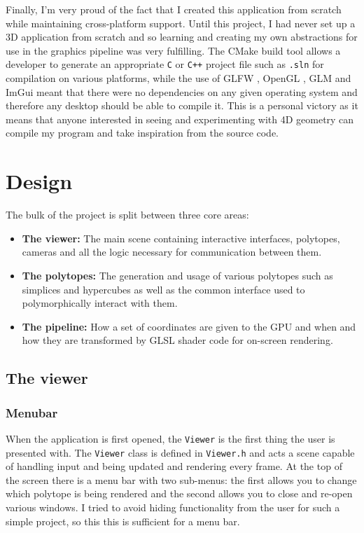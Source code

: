 \documentclass[11pt, a4paper]{article}
\begin{document}
Finally, I'm very proud of the fact that I created this application from scratch while maintaining cross-platform support. Until this project, I had never set up a 3D application from scratch and so learning and creating my own abstractions for use in the graphics pipeline was very fulfilling. The CMake build tool \parencite{cmake} allows a developer to generate an appropriate \texttt{C} or \texttt{C++} project file such as \texttt{.sln} for compilation on various platforms, while the use of GLFW \parencite{glfw}, OpenGL \parencite{opengl}, GLM \parencite{glm} and ImGui \parencite{imgui} meant that there were no dependencies on any given operating system and therefore any desktop should be able to compile it. This is a personal victory as it means that anyone interested in seeing and experimenting with 4D geometry can compile my program and take inspiration from the source code.

\section{Design}

The bulk of the project is split between three core areas:

\begin{itemize}
  \item \textbf{The viewer:} The main scene containing interactive interfaces, polytopes, cameras and all the logic necessary for communication between them.
  \item \textbf{The polytopes:} The generation and usage of various polytopes such as simplices and hypercubes as well as the common interface used to polymorphically interact with them.
  \item \textbf{The pipeline:} How a set of coordinates are given to the GPU and when and how they are transformed by GLSL shader code for on-screen rendering.
\end{itemize}

\subsection{The viewer}

\subsubsection{Menubar}

When the application is first opened, the \texttt{Viewer} is the first thing the user is presented with. The \texttt{Viewer} class is defined in \texttt{Viewer.h} and acts a scene capable of handling input and being updated and rendering every frame. At the top of the screen there is a menu bar with two sub-menus: the first allows you to change which polytope is being rendered and the second allows you to close and re-open various windows. I tried to avoid hiding functionality from the user for such a simple project, so this this is sufficient for a menu bar.
\end{document}
